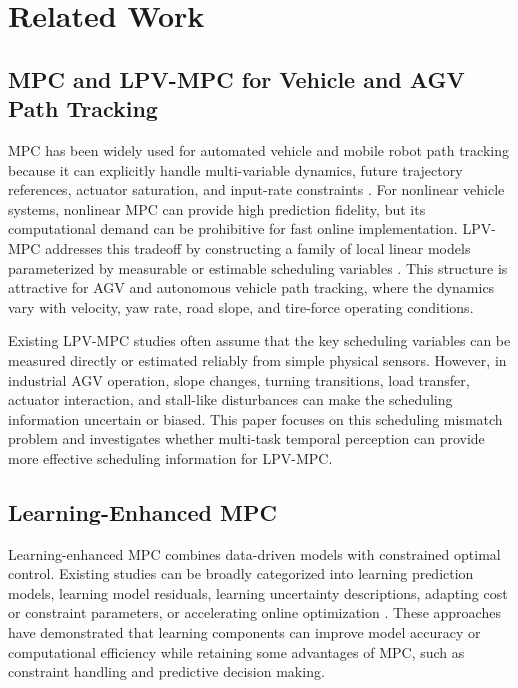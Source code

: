 \documentclass[twocolumn]{article}
\begin{document}
\section{Related Work}

\label{sec:related_work}

\subsection{MPC and LPV-MPC for Vehicle and AGV Path Tracking}

MPC has been widely used for automated vehicle and mobile robot path tracking because it can explicitly handle multi-variable dynamics, future trajectory references, actuator saturation, and input-rate constraints \cite{Stano2023MPCPathTrackingReview}. For nonlinear vehicle systems, nonlinear MPC can provide high prediction fidelity, but its computational demand can be prohibitive for fast online implementation. LPV-MPC addresses this tradeoff by constructing a family of local linear models parameterized by measurable or estimable scheduling variables \cite{Alcala2020LPVMPC}. This structure is attractive for AGV and autonomous vehicle path tracking, where the dynamics vary with velocity, yaw rate, road slope, and tire-force operating conditions.

Existing LPV-MPC studies often assume that the key scheduling variables can be measured directly or estimated reliably from simple physical sensors. However, in industrial AGV operation, slope changes, turning transitions, load transfer, actuator interaction, and stall-like disturbances can make the scheduling information uncertain or biased. This paper focuses on this scheduling mismatch problem and investigates whether multi-task temporal perception can provide more effective scheduling information for LPV-MPC.

\subsection{Learning-Enhanced MPC}

Learning-enhanced MPC combines data-driven models with constrained optimal control. Existing studies can be broadly categorized into learning prediction models, learning model residuals, learning uncertainty descriptions, adapting cost or constraint parameters, or accelerating online optimization \cite{Hewing2020LearningBasedMPC}. These approaches have demonstrated that learning components can improve model accuracy or computational efficiency while retaining some advantages of MPC, such as constraint handling and predictive decision making.
\end{document}
